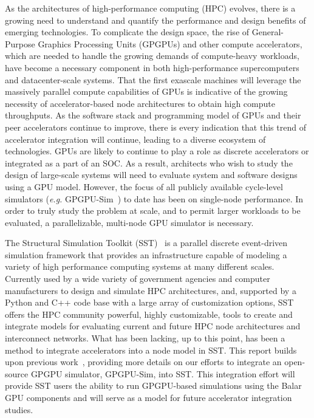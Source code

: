 As the architectures of high-performance computing (HPC) evolves, there is a growing
need to understand and quantify the performance and design benefits of
emerging technologies. To complicate the design space, the rise of
General-Purpose Graphics Processing Units (GPGPUs) and other compute
accelerators, which are needed to handle the growing demands of compute-heavy
workloads, have become a necessary component in both high-performance
supercomputers and datacenter-scale systems. That the first exascale machines
will leverage the massively parallel compute capabilities of GPUs
\cite{snl_roadmap, ornl_roadmap, llnl_roadmap} is indicative of the growing
necessity of accelerator-based node architectures to obtain high compute
throughputs. As the software stack and
programming model of GPUs and their peer accelerators continue to improve, there
is every indication that this trend of accelerator integration will continue,
leading to a diverse ecosystem of technologies. GPUs are likely to continue to
play a role as discrete accelerators or integrated as a part of an SOC. As a
result, architects who wish to study the design of large-scale systems will need
to evaluate system and software designs using a GPU model. However, the focus of
all publicly available cycle-level simulators ({\em e.g.} GPGPU-Sim~\cite{gpgpu_sim})
to date has been on single-node performance. In order to truly study the problem at scale,
and to permit larger workloads to be evaluated, a parallelizable, multi-node GPU
simulator is necessary.

The Structural Simulation Toolkit (SST)~\cite{sst} is a parallel discrete
event-driven simulation framework that provides an infrastructure capable of
modeling a variety of high performance computing systems at many different
scales. Currently used by a wide variety of government agencies and computer
manufacturers to design and simulate HPC architectures, and, supported by a
Python and C++ code base with a large array of customization options, SST offers
the HPC community powerful, highly customizable, tools to create and integrate
models for evaluating current and future HPC node architectures and interconnect
networks. What has been lacking, up to this point, has been a method
to integrate accelerators into a node model in SST. This report builds upon
previous work~\cite{sst_gpgpu}, providing more details on our efforts to
integrate an open-source GPGPU simulator, GPGPU-Sim, into SST. This integration effort
will provide SST users the ability to run GPGPU-based simulations using the Balar
GPU components and will serve as a model for future accelerator integration
studies.

